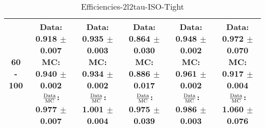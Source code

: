\documentclass[final,letterpaper,twoside,12pt]{article}
\begin{document}
\begin{table}[htbp]
\begin{adjustwidth}{-4em}{-4em}
\begin{tabular}{|c|c|c|c|c|c|}
60 - 100 & \parbox[c]{1.1 in}{ \scriptsize  Data: 0.918 $\pm$ 0.007 \newline MC: 0.940 $\pm$ 0.002 \newline $\frac{\rm{Data}}{\rm{MC}}$: 0.977 $\pm$ 0.007} & \parbox[c]{1.1 in}{ \scriptsize  Data: 0.935 $\pm$ 0.003 \newline MC: 0.934 $\pm$ 0.002 \newline $\frac{\rm{Data}}{\rm{MC}}$: 1.001 $\pm$ 0.004} & \parbox[c]{1.1 in}{ \scriptsize  Data: 0.864 $\pm$ 0.030 \newline MC: 0.886 $\pm$ 0.017 \newline $\frac{\rm{Data}}{\rm{MC}}$: 0.975 $\pm$ 0.039} & \parbox[c]{1.1 in}{ \scriptsize  Data: 0.948 $\pm$ 0.002 \newline MC: 0.961 $\pm$ 0.002 \newline $\frac{\rm{Data}}{\rm{MC}}$: 0.986 $\pm$ 0.003} & \parbox[c]{1.1 in}{ \scriptsize  Data: 0.972 $\pm$ 0.070 \newline MC: 0.917 $\pm$ 0.004 \newline $\frac{\rm{Data}}{\rm{MC}}$: 1.060 $\pm$ 0.076}\\ \hline 
\end{tabular}
\caption {Efficiencies-2l2tau-ISO-Tight}
\label{tab:cqdata0}
\end{adjustwidth}\end{table}
\end{document}
